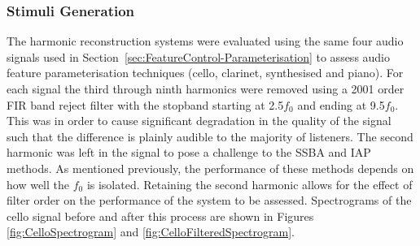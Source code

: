 		\subsubsection*{Stimuli Generation}
			The harmonic reconstruction systems were evaluated using the same four audio signals used in
			Section~\ref{sec:FeatureControl-Parameterisation} to assess audio feature parameterisation
			techniques (cello, clarinet, synthesised and piano). For each signal the third through ninth
			harmonics were removed using a 2001 order FIR band reject filter with the stopband
			starting at 2.5$f_{0}$ and ending at 9.5$f_{0}$. This was in order to cause significant degradation
			in the quality of the signal such that the difference is plainly audible to the majority of
			listeners. The second harmonic was left in the signal to pose a challenge to the SSBA and IAP
			methods. As mentioned previously, the performance of these methods depends on how well the $f_{0}$
			is isolated.  Retaining the second harmonic allows for the effect of filter order on the
			performance of the system to be assessed. Spectrograms of the cello signal before and after this
			process are shown in Figures \ref{fig:CelloSpectrogram} and \ref{fig:CelloFilteredSpectrogram}. 

